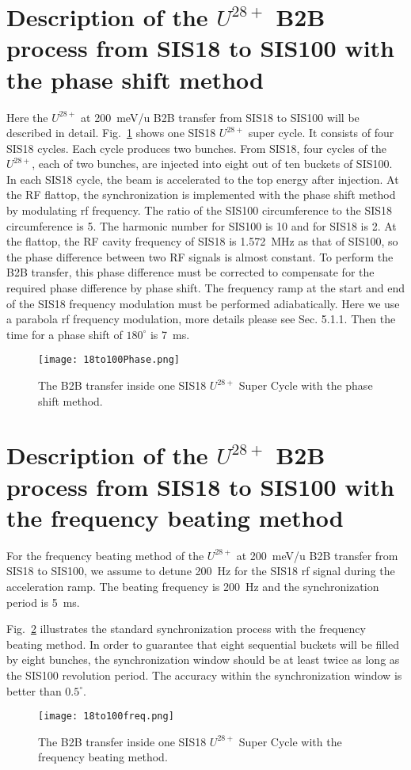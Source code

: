 \section{Description of the $U^{28+}$ B2B process from SIS18 to SIS100 with the phase shift method}
Here the $U^{28+}$ at \SI{200}{meV/\atomicmassunit} B2B transfer from SIS18 to SIS100 will be described in detail. Fig.~\ref{18to100Phase} shows one SIS18 $U^{28+}$ super cycle. It consists of four SIS18 cycles. Each cycle produces two bunches. From SIS18, four cycles of the $U^{28+}$, each of two bunches, are injected into eight out of ten buckets of SIS100. In each SIS18 cycle, the beam is accelerated to the top energy after injection. At the RF flattop, the synchronization is implemented with the phase shift method by modulating rf frequency. 
The ratio of the SIS100 circumference to the SIS18 circumference is 5. The harmonic number for SIS100 is 10 and for SIS18 is 2. At the flattop, the RF cavity frequency of SIS18 is \SI{1.572}{MHz} as that of SIS100, so the phase difference between two RF signals is almost constant. To perform the B2B transfer, this phase difference must be corrected to compensate for the required phase difference by phase shift. The frequency ramp at the start and end of the SIS18 frequency modulation must be performed adiabatically. Here we use a parabola rf frequency modulation, more details please see Sec. 5.1.1.  Then the time for a phase shift of  $180^\circ$ is \SI{7}{\ms}.
\begin{figure}[H]
   \centering   
   \texttt{[image: 18to100Phase.png]}
   \caption{The B2B transfer inside one SIS18 $U^{28+}$ Super Cycle with the phase shift method.}
   \label{18to100Phase}
\end{figure}
\section{Description of the $U^{28+}$ B2B process from SIS18 to SIS100 with the frequency beating method}
For the frequency beating method of the $U^{28+}$ at \SI{200}{meV/\atomicmassunit} B2B transfer from SIS18 to SIS100, we assume to detune \SI{200}{Hz} for the SIS18 rf signal during the acceleration ramp. The beating frequency is \SI{200}{Hz} and the synchronization period is \SI{5}{\ms}.

Fig.~\ref{18to100freq} illustrates the standard synchronization process with the frequency beating method. In order to guarantee that eight sequential buckets will be filled by eight bunches, the synchronization window should be at least twice as long as the SIS100 revolution period. The accuracy within the synchronization window is better than $0.5^\circ$. 
\begin{figure}[!htb]
   \centering   
   \texttt{[image: 18to100freq.png]}
   \caption{The B2B transfer inside one SIS18 $U^{28+}$ Super Cycle with the frequency beating method.}
   \label{18to100freq}
\end{figure}
 
